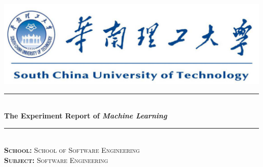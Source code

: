 \documentclass[journal, a4paper]{IEEEtran}
\begin{document}
\begin{titlepage}

\newcommand{\HRule}{\rule{\linewidth}{0.5mm}} %

\center %

~\\[1cm]
\includegraphics{SCUT.png}\\[2cm] %


\HRule \\[1cm]
{ \huge \bfseries The Experiment Report of \textit{Machine Learning} }\\[0.6cm] %
\HRule \\[2cm]


\textsc{\LARGE \textbf{School:} School of Software Engineering}\\[1cm]
\textsc{\LARGE \textbf{Subject:} Software Engineering}\\[2cm] 

 


\end{titlepage}
\end{document}
